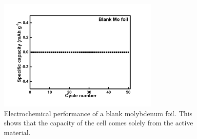 \begin{figure}[htb!]
\centering
\includegraphics[width=8cm]{Figures/chap4fig/S8}
\caption{Electrochemical performance of a blank molybdenum foil. This shows that the capacity of the cell comes solely from the active material.}
\label{Figures/chap4fig:S8}
\end{figure}



